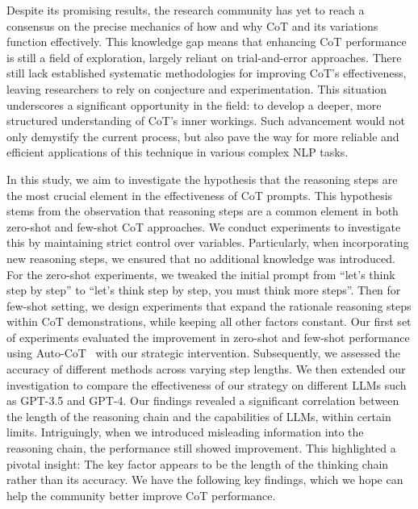 \documentclass[11pt]{article}
\begin{document}
Despite its promising results, the research community has yet to reach a consensus on the precise mechanics of how and why CoT and its variations function effectively. This knowledge gap means that enhancing CoT performance is still a field of exploration, largely reliant on trial-and-error approaches. There still lack established systematic methodologies for improving CoT's effectiveness, leaving researchers to rely on conjecture and experimentation. This situation underscores a significant opportunity in the field: to develop a deeper, more structured understanding of CoT's inner workings. Such advancement would not only demystify the current process, but also pave the way for more reliable and efficient applications of this technique in various complex NLP tasks.

In this study, we aim to investigate the hypothesis that the reasoning steps are the most crucial element in the effectiveness of CoT prompts. This hypothesis stems from the observation that reasoning steps are a common element in both zero-shot and few-shot CoT approaches. We conduct experiments to investigate this by maintaining strict control over variables. Particularly, when incorporating new reasoning steps, we ensured that no additional knowledge was introduced. For the zero-shot experiments, we tweaked the initial prompt from ``let's think step by step'' to ``let's think step by step, you must think more steps''. Then for few-shot setting, we design experiments that expand the rationale reasoning steps within CoT demonstrations, while keeping all other factors constant.
Our first set of experiments evaluated the improvement in zero-shot and few-shot performance using Auto-CoT~\cite{zhang2022automatic} with our strategic intervention. Subsequently, we assessed the accuracy of different methods across varying step lengths. We then extended our investigation to compare the effectiveness of our strategy on different LLMs such as GPT-3.5 and GPT-4. Our findings revealed a significant correlation between the length of the reasoning chain and the capabilities of LLMs, within certain limits. Intriguingly, when we introduced misleading information into the reasoning chain, the performance still showed improvement. This highlighted a pivotal insight: The key factor appears to be the length of the thinking chain rather than its accuracy.
We have the following key findings, which we hope can help the community better improve CoT performance.
\end{document}
